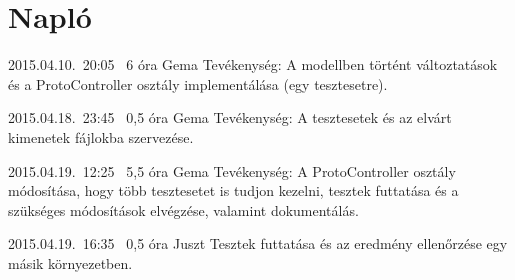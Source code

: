 %
\section{Napló}

\begin{naplo}

\bejegyzes
{2015.04.10.~20:05~}
{6 óra}
{Gema}
{Tevékenység: A modellben történt változtatások és a ProtoController osztály implementálása (egy tesztesetre).}

\bejegyzes
{2015.04.18.~23:45~}
{0,5 óra}
{Gema}
{Tevékenység: A tesztesetek és az elvárt kimenetek fájlokba szervezése.}

\bejegyzes
{2015.04.19.~12:25~}
{5,5 óra}
{Gema}
{Tevékenység: A ProtoController osztály módosítása, hogy több tesztesetet is tudjon kezelni, tesztek futtatása és a szükséges módosítások elvégzése, valamint dokumentálás.}

\bejegyzes
{2015.04.19.~16:35~}
{0,5 óra}
{Juszt}
{Tesztek futtatása és az eredmény ellenőrzése egy másik környezetben.}


\end{naplo}

